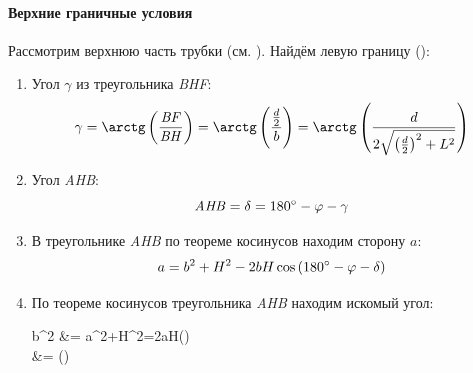 \documentclass[../AISTR.tex]{subfiles}
\begin{document}
\paragraph{Верхние граничные условия}
Рассмотрим верхнюю часть трубки (см. ). Найдём левую границу ():
\begin{enumerate}
	\item Угол $\gamma$ из треугольника \textit{BHF}:
	\begin{equation}
		\gamma = \arctg \left(\frac{\mathit{BF}}{\mathit{BH}}\right) = \arctg\left(\frac{\frac{d}{2}}{b}\right)=\arctg \left(\frac{d}{2\sqrt{\left(\frac{d}{2}\right)^2+L^2}}\right)
	\end{equation}
	\item Угол \textit{AHB}:
	\begin{equation}
		\mathit{AHB} = \delta = 180^\circ-\varphi-\gamma
	\end{equation}
	\item В треугольнике \textit{AHB} по теореме косинусов находим сторону  $a$:
	\begin{equation}
		a = b^2 + H^2 - 2bH \cos \left(180^\circ - \varphi - \delta\right)
	\end{equation}
	\item По теореме косинусов треугольника \textit{AHB} находим искомый угол:
	\begin{aleq}
		b^2 &= a^2+H^2=2aH\cos\left(\lu\right)\\
		\lu &= \arccos \left(\right)		
	\end{aleq}
\end{enumerate}
\end{document}
